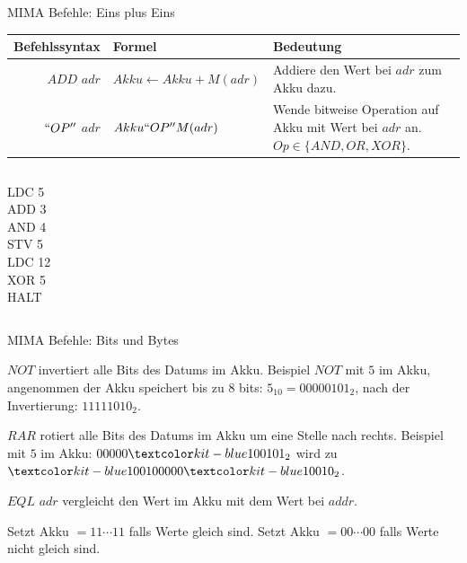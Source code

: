 \documentclass[handout]{beamer}
\begin{document}
\begin{frame}{MIMA Befehle: Eins plus Eins}
	\begin{tabular}{r | l p{5cm} }
		Befehlssyntax & Formel & Bedeutung\\\hline\hline 
		$ADD$ $adr$ & $Akku \leftarrow Akku + M(adr)$ & Addiere den Wert bei $adr$ zum Akku dazu.\\\hline
		$``OP''$ $adr$ & $Akku ``OP'' M(adr)$ & Wende bitweise Operation auf Akku mit Wert bei $adr$ an. $Op \in \{AND, OR, XOR\}$.
	\end{tabular}
	
	\bp 
	\vspace{.5cm}
	\vspace{.2cm}
	
	\begin{columns}
		\begin{column}{0.5\textwidth}
			LDC 5 \\ ADD 3 \\ AND 4 \\ STV 5 \\ LDC 12 \\ XOR 5 \\ HALT
		\end{column}
		
		\begin{column}{0.5\textwidth}
			\begin{memory}
			\end{memory}
		\end{column}
	\end{columns}
\end{frame}

\begin{frame}{MIMA Befehle: Bits und Bytes }
	\begin{itemize}
		\pitem $NOT$ invertiert alle Bits des Datums im Akku. \ip Beispiel $NOT$ mit $5$ im Akku, angenommen der Akku speichert bis zu 8 bits\ip : $5_{10} = 00000101_2$, nach der Invertierung: $1111 1010_2$.
		
		\pitem $RAR$ rotiert alle Bits des Datums im Akku um eine Stelle nach rechts. \ip Beispiel mit $5$ im Akku: $00000\markBlue{101}_2$ wird zu $\markBlue{1}00000\markBlue{10}_2$.
		
		\pitem $EQL$ $adr$ vergleicht den Wert im Akku mit dem Wert bei $addr$.
		\begin{itemize}
			\pitem Setzt Akku $= 11\cdots 11$ falls Werte gleich sind.
			\pitem Setzt Akku $= 00\cdots 00$ falls Werte nicht gleich sind.
		\end{itemize}
	\end{itemize}
\end{frame}
	
\end{document}
